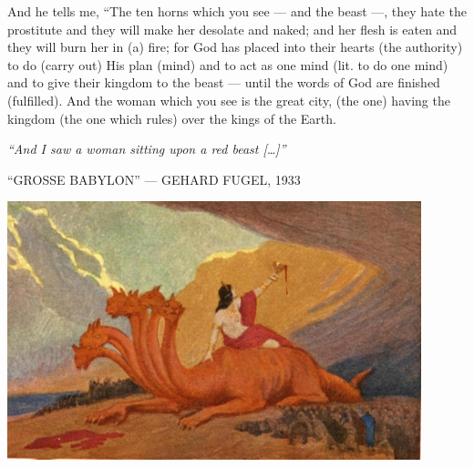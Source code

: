 \begin{pages}
\begin{Leftside}
		\pend
		\pstart
		And he tells me, “The ten horns which you see — and the beast —, they hate the prostitute and they will make her desolate and naked; and her flesh is eaten and they will burn her in (a) fire; for God has placed into their hearts (the authority) to do (carry out) His plan (mind) and to act as one mind (lit. to do one mind) and to give their kingdom to the beast — until the words of God are finished (fulfilled). And the woman which you see is the great city, (the one) having the kingdom (the one which rules) over the kings of the Earth. 
		\pend
        \endnumbering
    \end{Leftside}

\end{pages} 
\Pages

\clearpage
\thispagestyle{empty}
\null\vfill
\settowidth{}
\begin{center}
\parbox{\longest}{%
  \raggedright{\huge\itshape%
    ``And I saw a woman sitting upon a red beast […]'' \par\bigskip
  }
  \raggedleft\Large\MakeUppercase{``Grosse Babylon'' — Gehard Fugel, 1933}\par%
}
\vfill\vfill
\clearpage\newpage
\end{center}
\newpage
\thispagestyle{empty}
\begin{center}
	\includegraphics[angle=90, width=0.90\textwidth]{images/illustrations/fugelprostitute}
\end{center}